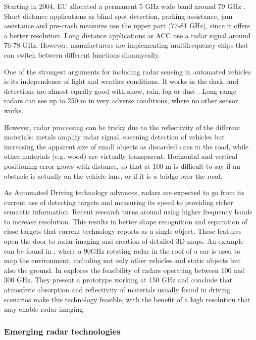 Starting in 2004, EU allocated a permanent 5 GHz wide band around 79 GHz 
\cite{EULawandPublications2004}. 
Short distance applications as blind spot detection, parking assistance, jam 
assistance and pre-crash measures use the upper part (77-81 GHz), since it 
offers a better resolution. Long distance applications as ACC use a radar 
signal around 76-78 GHz. However, manufacturers are implementing multifrequency 
chips that can switch between different functions dinamycally.

One of the strongest arguments for including radar sensing in automated 
vehicles is its independence of light and weather conditions. 
It works in the dark, and detections are almost equally good with snow, 
rain, fog or dust \cite{Reina2015}. Long range radars can see up to 250 m
in very adverse conditions, where no other sensor works.

However, radar processing can be tricky due to the reflectivity of the
different materials: metals amplify radar signal, easening detection of 
vehicles but increasing the apparent size of small objects as discarded cans
in the road, while other materials (e.g. wood) are virtually transparent.
Horizontal and vertical positioning error 
grows with distance, so that at 100 m is difficult to say if an obstacle is
actually on the vehicle lane, or if it is a bridge over the road.

As Automated Driving technology advances, radars are expected to go from its
current use of detecting targets and measuring its speed to providing richer
semantic information. 
Recent research turns around using higher frequency bands to increase
resolution. This results in better shape recognition and separation of close
targets that current technology reports as a single object.
These features open the door to radar imaging and creation of detailed 3D maps. 
An example can be found in \cite{Reina2015}, where a 90GHz rotating radar in
the roof of a car is used to map the environment, including not only other
vehicles and static objects but also the ground.
In \cite{Kohler2013} explores the feasibility of radars operating between 
100 and 300 GHz. They present a prototype working at 150 GHz and conclude 
that atmosferic absorption and reflectivity of materials usually found in 
driving scenarios make this technology feasible, with the benefit of a high
resolution that may enable radar imaging.


\subsubsection{Emerging radar technologies}

